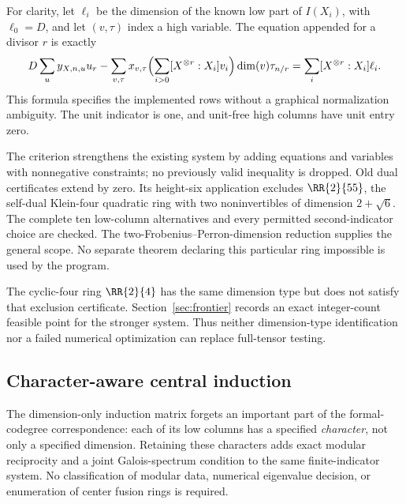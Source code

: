 For clarity, let $\ell_i$ be the dimension of the known low part of
$I(X_i)$, with $\ell_0=D$, and let $(v,\tau)$ index a high variable.
The equation appended for a divisor $r$ is exactly
\begin{equation}\label{eq:rotation-row}
 D\sum_u y_{X,n,u}u_r
 -\sum_{v,\tau}x_{v,\tau}\Bigl(\sum_{i>0}[X^{\otimes r}:X_i]v_i\Bigr)
                 \dim(v)\tau_{n/r}
 =\sum_i[X^{\otimes r}:X_i]\ell_i.
\end{equation}
This formula specifies the implemented rows without a graphical
normalization ambiguity. The unit indicator is one, and unit-free high
columns have unit entry zero.

The criterion strengthens the existing system by adding equations and
variables with nonnegative constraints; no previously valid inequality
is dropped. Old dual certificates extend by zero. Its height-six
application excludes $\RR{2}{55}$, the self-dual Klein-four quadratic
ring with two noninvertibles of dimension $2+\sqrt6$. The complete ten
low-column alternatives and every permitted second-indicator choice
are checked. The two-Frobenius--Perron-dimension reduction supplies the
general scope. No separate theorem declaring this particular ring
impossible is used by the program.

The cyclic-four ring $\RR{2}{4}$ has the same dimension type but does not
satisfy that exclusion certificate. Section~\ref{sec:frontier} records
an exact integer-count feasible point for the stronger system. Thus
neither dimension-type identification nor a failed numerical optimization
can replace full-tensor testing.



\subsection{Character-aware central induction}\label{sec:character-induction}
The dimension-only induction matrix forgets an important part of the
formal-codegree correspondence: each of its low columns has a specified
\emph{character}, not only a specified dimension. Retaining these
characters adds exact modular reciprocity and a joint Galois-spectrum
condition to the same finite-indicator system. No classification of
modular data, numerical eigenvalue decision, or enumeration of center
fusion rings is required.

